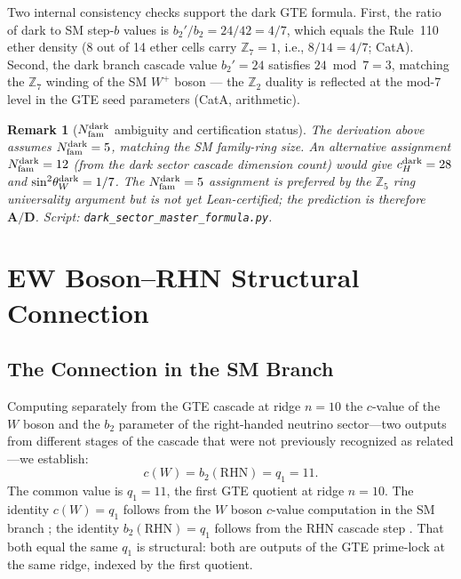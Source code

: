 \documentclass[11pt]{article}
\newtheorem{remark}{Remark}[section]
\newcommand{\CatAD}{\textbf{A/D}}
\begin{document}
Two internal consistency checks support the dark GTE formula.
First, the ratio of dark to SM step-$b$ values is
$b_2'/b_2 = 24/42 = 4/7$, which equals the Rule~110 ether density
(8 out of 14 ether cells carry $\mathbb{Z}_7 = 1$, i.e., $8/14 = 4/7$; CatA).
Second, the dark branch cascade value $b_2' = 24$ satisfies $24 \bmod 7 = 3$, matching
the $\mathbb{Z}_7$ winding of the SM $W^+$ boson --- the $\mathbb{Z}_2$ duality is reflected
at the mod-7 level in the GTE seed parameters (CatA, arithmetic).

\begin{remark}[$N_{\rm fam}^{\rm dark}$ ambiguity and certification status]
The derivation above assumes $N_{\rm fam}^{\rm dark} = 5$, matching the SM family-ring size.
An alternative assignment $N_{\rm fam}^{\rm dark} = 12$ (from the dark sector cascade
dimension count) would give $c_H^{\rm dark} = 28$ and $\sin^2\!\theta_W^{\rm dark} = 1/7$.
The $N_{\rm fam}^{\rm dark} = 5$ assignment is preferred by the $\mathbb{Z}_5$ ring universality
argument but is not yet Lean-certified; the prediction is therefore $\CatAD$.
Script: \texttt{dark\_sector\_master\_formula.py}.
\end{remark}

\section{EW Boson--RHN Structural Connection}
\label{sec:ew_rhn}

\subsection{The Connection in the SM Branch}
\label{ssec:ew_rhn_sm}

Computing separately from the GTE cascade at ridge $n=10$ the $c$-value of the $W$
boson and the $b_2$ parameter of the right-handed neutrino sector---two outputs from
different stages of the cascade that were not previously recognized as related---we
establish:
\begin{equation}
c(W) = b_2(\mathrm{RHN}) = q_1 = 11.
\label{eq:ew_rhn_sm}
\end{equation}
The common value is $q_1=11$, the first GTE quotient at ridge $n=10$. The identity
$c(W) = q_1$ follows from the $W$ boson $c$-value computation in the SM branch
\cite{SpivackBraidAtlas}; the identity $b_2(\mathrm{RHN}) = q_1$ follows from the RHN
cascade step \cite{SpivackNeutrino}. That both equal the same $q_1$ is structural: both
are outputs of the GTE prime-lock at the same ridge, indexed by the first quotient.
\end{document}
